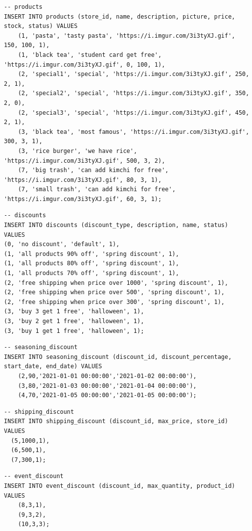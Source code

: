 \documentclass[a4paper, 12pt]{article}
\begin{document}
\begin{lstlisting}
-- products
INSERT INTO products (store_id, name, description, picture, price, stock, status) VALUES
    (1, 'pasta', 'tasty pasta', 'https://i.imgur.com/3i3tyXJ.gif', 150, 100, 1),
    (1, 'black tea', 'student card get free', 'https://i.imgur.com/3i3tyXJ.gif', 0, 100, 1),
    (2, 'special1', 'special', 'https://i.imgur.com/3i3tyXJ.gif', 250, 2, 1),
    (2, 'special2', 'special', 'https://i.imgur.com/3i3tyXJ.gif', 350, 2, 0),
    (2, 'special3', 'special', 'https://i.imgur.com/3i3tyXJ.gif', 450, 2, 1),
    (3, 'black tea', 'most famous', 'https://i.imgur.com/3i3tyXJ.gif', 300, 3, 1),
    (3, 'rice burger', 'we have rice', 'https://i.imgur.com/3i3tyXJ.gif', 500, 3, 2),
    (7, 'big trash', 'can add kimchi for free', 'https://i.imgur.com/3i3tyXJ.gif', 80, 3, 1),
    (7, 'small trash', 'can add kimchi for free', 'https://i.imgur.com/3i3tyXJ.gif', 60, 3, 1);
\end{lstlisting}

\begin{lstlisting}
-- discounts
INSERT INTO discounts (discount_type, description, name, status) VALUES
(0, 'no discount', 'default', 1),
(1, 'all products 90% off', 'spring discount', 1),
(1, 'all products 80% off', 'spring discount', 1),
(1, 'all products 70% off', 'spring discount', 1),
(2, 'free shipping when price over 1000', 'spring discount', 1),
(2, 'free shipping when price over 500', 'spring discount', 1),
(2, 'free shipping when price over 300', 'spring discount', 1),
(3, 'buy 3 get 1 free', 'halloween', 1),
(3, 'buy 2 get 1 free', 'halloween', 1),
(3, 'buy 1 get 1 free', 'halloween', 1);
\end{lstlisting}

\begin{lstlisting}
-- seasoning_discount
INSERT INTO seasoning_discount (discount_id, discount_percentage, start_date, end_date) VALUES
    (2,90,'2021-01-01 00:00:00','2021-01-02 00:00:00'),
    (3,80,'2021-01-03 00:00:00','2021-01-04 00:00:00'),
    (4,70,'2021-01-05 00:00:00','2021-01-05 00:00:00');
\end{lstlisting}

\begin{lstlisting}
-- shipping_discount
INSERT INTO shipping_discount (discount_id, max_price, store_id) VALUES
  (5,1000,1),
  (6,500,1),
  (7,300,1);
\end{lstlisting}

\begin{lstlisting}
-- event_discount
INSERT INTO event_discount (discount_id, max_quantity, product_id) VALUES
    (8,3,1),
    (9,3,2),
    (10,3,3);
\end{lstlisting}
\end{document}
